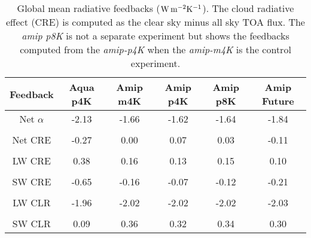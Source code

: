\documentclass[draft]{agujournal2019}
\begin{document}
%


\begin{table}
\begin{center}
\caption{Global mean radiative feedbacks ($\rm{W\, m^{-2} K^{-1}}$).  The cloud radiative effect (CRE) is computed as
 the clear sky minus all sky TOA flux.   The \textit{amip p8K} is not a separate experiment but
shows the feedbacks computed from the \textit{amip-p4K} when the \textit{amip-m4K} is the control experiment.}
    \begin{tabular}{*{6}{c}}
    \hline
    \hline
 Feedback & Aqua p4K & Amip m4K & Amip p4K &  Amip p8K & Amip Future   \\ \hline
    Net  $\alpha$        &   -2.13      &  -1.66          &  -1.62         & -1.64           & -1.84           \\ 
    \\
    Net CRE   & -0.27       &  0.00              & 0.07         & 0.03         & -0.11            \\  
    \\
    LW CRE   & 0.38        &  0.16              & 0.13           & 0.15        & 0.10             \\  
    \\
    SW CRE  & -0.65     &  -0.16              & -0.07          & -0.12        & -0.21            \\  
    \\
    LW CLR   & -1.96       &  -2.02            & -2.02           & -2.02       & -2.03            \\  
    \\
    SW CLR  & 0.09        & 0.36              & 0.32             & 0.34        & 0.30             \\  \hline

    \end{tabular}\par
    \label{tab:lambda_AGCM}
\end{center}
\end{table}
\end{document}
